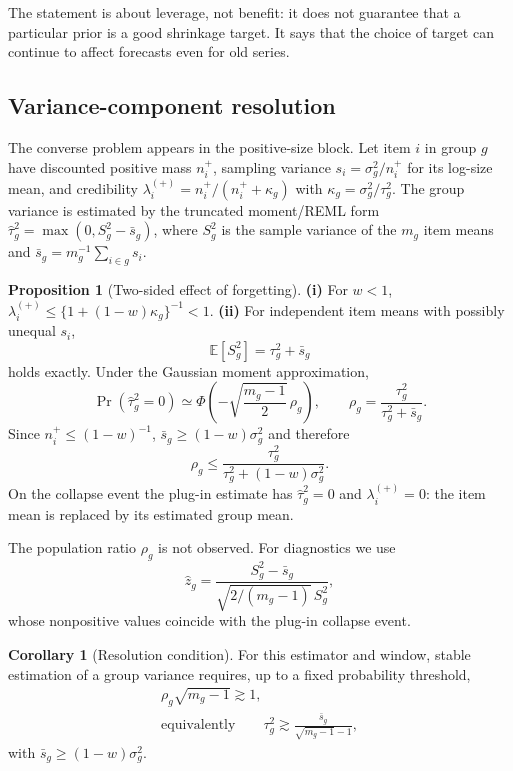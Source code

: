 \documentclass[twoside]{article}
\theoremstyle{definition}
\newtheorem{proposition}{Proposition}
\newtheorem{corollary}{Corollary}
\newcommand{\E}{\mathbb{E}}
\begin{document}
The statement is about leverage, not benefit: it does not guarantee
that a particular prior is a good shrinkage target. It says that the
choice of target can continue to affect forecasts even for old series.

\subsection{Variance-component resolution}\label{sec:resolution}

The converse problem appears in the positive-size block. Let item $i$
in group $g$ have discounted positive mass $n_i^+$, sampling variance
$s_i=\sigma_g^2/n_i^+$ for its log-size mean, and credibility
$\lambda_i^{(+)}=n_i^+/(n_i^++\kappa_g)$ with
$\kappa_g=\sigma_g^2/\tau_g^2$. The group variance is estimated by the
truncated moment/REML form
$\hat\tau_g^2=\max(0,S_g^2-\bar s_g)$, where $S_g^2$ is the sample
variance of the $m_g$ item means and
$\bar s_g=m_g^{-1}\sum_{i\in g}s_i$.

\begin{proposition}[Two-sided effect of forgetting]
\label{prop:twosided}
\textbf{(i)} For $w<1$,
$\lambda_i^{(+)}\le\{1+(1-w)\kappa_g\}^{-1}<1$.
\textbf{(ii)} For independent item means with possibly unequal $s_i$,
\[
\E[S_g^2]=\tau_g^2+\bar s_g
\]
holds exactly. Under the Gaussian moment approximation,
\begin{equation}
\Pr(\hat\tau_g^2=0)\simeq
\Phi\!\left(-\sqrt{\frac{m_g-1}{2}}\,\rho_g\right),
\qquad
\rho_g=\frac{\tau_g^2}{\tau_g^2+\bar s_g}.
\label{eq:collapse-prob}
\end{equation}
Since $n_i^+\le(1-w)^{-1}$,
$\bar s_g\ge(1-w)\sigma_g^2$ and therefore
\[
\rho_g\le
\frac{\tau_g^2}{\tau_g^2+(1-w)\sigma_g^2}.
\]
On the collapse event the plug-in estimate has $\hat\tau_g^2=0$ and
$\lambda_i^{(+)}=0$: the item mean is replaced by its estimated group
mean.
\end{proposition}

The population ratio $\rho_g$ is not observed. For diagnostics we use
\[
\hat z_g=\frac{S_g^2-\bar s_g}
{\sqrt{2/(m_g-1)}\,S_g^2},
\]
whose nonpositive values coincide with the plug-in collapse event.

\begin{corollary}[Resolution condition]
\label{cor:resolution}
For this estimator and window, stable estimation of a group variance
requires, up to a fixed probability threshold,
\begin{gather*}
\rho_g\sqrt{m_g-1}\gtrsim1,\\
\text{equivalently}\qquad
\tau_g^2\gtrsim
\frac{\bar s_g}{\sqrt{m_g-1}-1},
\end{gather*}
with $\bar s_g\ge(1-w)\sigma_g^2$.
\end{corollary}
\end{document}
